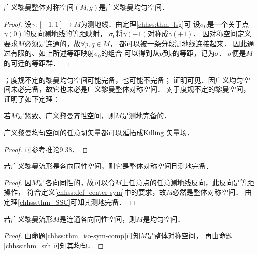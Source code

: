 \begin{proposition}\label{chhss:thm_srh}
    广义黎曼整体对称空间$(M,g)$是广义黎曼均匀空间．
\end{proposition}
\begin{proof}
    设$\gamma:[-1,1]\to M$为测地线．由定理\ref{chhss:thm_lsg}可
    设$\sigma_0$是一个关于点$\gamma(0)$的反向测地线的等距映射，
    $\sigma_0$将$\gamma(-1)$对称成$\gamma(+1)$．
    因对称空间定义要求$M$必须是连通的，故$\forall p,q \in M$，
    都可以被一条分段测地线连接起来．
    因此通过有限的、如上所述等距映射$\sigma_0$的组合
    可以得到从$p$到$q$的等距，记为$\sigma$．
    $\sigma$便是$M$的可迁的等距群．
\end{proof}


；度规不定的黎曼均匀空间可能完备，也可能不完备；
证明可见\parencite[9.37]{oneill1983}．因广义均匀空间未必完备，故它也未必是广义黎曼整体对称空间．
对于度规不定的黎曼空间，\textcite{marsden-1973}证明了如下定理：

\begin{theorem}\label{chhss:thm_marsden}
    若$M$是紧致、广义黎曼齐性空间，则$M$是测地完备的．    
\end{theorem}


\begin{proposition}\label{chhss:thm_h-killing}
    广义黎曼均匀空间的任意切矢量都可以延拓成Killing 矢量场．
\end{proposition}
\begin{proof}
    可参考\parencite{oneill1983}推论9.38．
\end{proof}


\begin{proposition}\label{chhss:thm_iso-sym-comp}
    若广义黎曼流形是各向同性空间，则它是整体对称空间且测地完备．
\end{proposition}
\begin{proof}
    因$M$是各向同性的，故可以令$M$上任意点的任意测地线反向，此反向是等距操作，
    符合定义\ref{chhss:def_center-sym}中的要求，故$M$必然是整体对称空间．
    由定理\ref{chhss:thm_SSC}可知其测地完备．
\end{proof}


\begin{proposition}
    若广义黎曼流形$M$是连通各向同性空间，则$M$是均匀空间．
\end{proposition}
\begin{proof}
    由命题\ref{chhss:thm_iso-sym-comp}可知$M$是整体对称空间，
    再由命题\ref{chhss:thm_srh}可知其均匀．
\end{proof}


